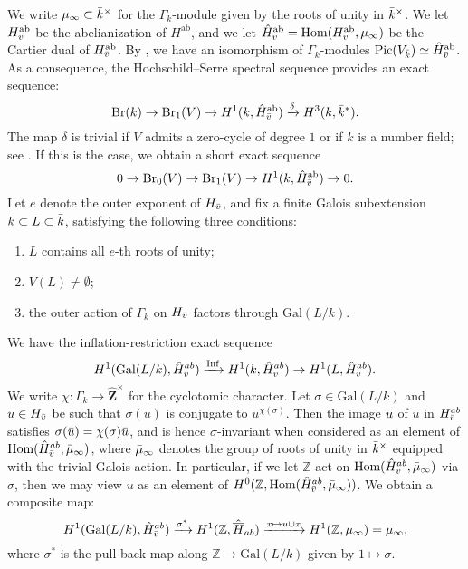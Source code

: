 \documentclass[10pt,letterpaper,twoside]{article}
\renewcommand{\1}{\mathbf{1}}
\newcommand{\bZ}{\mathbf{Z}}
\newcommand{\Br}{\mathrm{Br}}
\theoremstyle{plain}
\theoremstyle{plain}
\theoremstyle{definition}
\theoremstyle{named}
\theoremstyle{definition}
\begin{document}
	We write $\mu_{\infty}\subset \Bar{k}^\times$ for the $\Gamma_k$-module given by the roots of unity in $\Bar{k}^\times$. We let $H^{\mathrm{ab}}_{\Bar{v}}$ be the abelianization of  $H^{\mathrm{ab}}$, and we let $\hat{H}^{\mathrm{ab}}_{\Bar{v}}= \mathrm{Hom}(H^{\mathrm{ab}}_{\Bar{v}}, \mu_{\infty})$ be the Cartier dual of $H^{\mathrm{ab}}_{\Bar{v}}$. By \cite{}, we have an isomorphism of $\Gamma_k$-modules $\text{Pic}(V_{\Bar{k}})\simeq \hat{H}^{\mathrm{ab}}_{\Bar{v}}$. As a consequence, the Hochschild–Serre spectral sequence provides an exact sequence:
	\[
	\text{Br}(k) \to \text{Br}_1(V) \to H^1(k, \hat{H}^{\mathrm{ab}}_{\Bar{v}}) \xrightarrow{\delta} H^3(k, \bar{k}^*).
	\]
	The map $\delta$ is trivial if $V$ admits a zero-cycle of degree $1$ or if $k$ is a number field; see \cite{}. If this is the case, we obtain a short exact sequence
	\[0\to \Br_0(V)\to \Br_1(V)\to H^1(k, \hat{H}^{\mathrm{ab}}_{\Bar{v}})\to 0.\]
	Let $e$ denote the outer exponent of $H_{\Bar{v}}$, and fix a finite Galois subextension $k\subset L\subset \Bar{k}$, satisfying the following three conditions:
	\begin{enumerate}
		\item $L$ contains all $e$-th roots of unity;
		\item $V(L) \neq \emptyset$;
		\item the outer action of $\Gamma_k$ on $H_{\Bar{v}}$ factors through $\mathrm{Gal}(L/k)$.
	\end{enumerate}
	We have the inflation-restriction exact sequence \[H^1(\mathrm{Gal}(L/k),\hat{H}^{ab}_{\Bar{v}})\xrightarrow{\mathrm{Inf}}H^1(k,\hat{H}^{ab}_{\Bar{v}})\to H^1(L,\hat{H}^{ab}_{\Bar{v}}).\]	
	We write $\chi:\Gamma_k\to \hat{\bZ}^\times$ for the cyclotomic character. Let $\sigma \in \mathrm{Gal}(L/k)$ and $u \in H_{\Bar{v}}$ be such that $\sigma(u)$ is conjugate to $u^{\chi(\sigma)}$. Then the image $\Bar{u}$ of $u$ in $H^{ab}_{\Bar{v}}$ satisfies $\sigma(\Bar{u}) = \chi(\sigma)\Bar{u}$, and is hence $\sigma$-invariant when considered as an element of $\text{Hom}(\hat{H}^{ab}_{\Bar{v}}, \Bar{\mu}_\infty)$, where $\Bar{\mu}_\infty$ denotes the group of roots of unity in $\Bar{k}^\times$ equipped with the trivial Galois action. In particular, if we let $\mathbb{Z}$ act on $\text{Hom}(\hat{H}^{ab}_{\Bar{v}}, \Bar{\mu}_\infty)$ via $\sigma$, then we may view $u$ as an element of $H^0(\mathbb{Z}, \text{Hom}(\hat{H}^{ab}_{\Bar{v}}, \Bar{\mu}_\infty))$. We obtain a composite map:
	\[
	H^1(\mathrm{Gal}(L/k), \hat{H}^{ab}_{\Bar{v}}) \xrightarrow{\sigma^*} H^1(\mathbb{Z}, \hat{\overline{H}}_{ab}) \xrightarrow{x \mapsto u \cup x} H^1(\mathbb{Z}, \mu_\infty) = \mu_\infty,
	\]
	where $\sigma^*$ is the pull-back map along $\mathbb{Z} \rightarrow \mathrm{Gal}(L/k)$ given by $1 \mapsto \sigma$.
	
\end{document}
